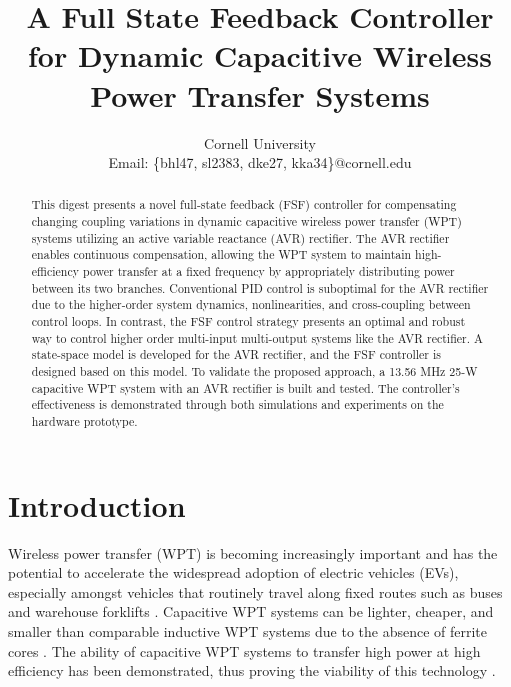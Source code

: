 \documentclass[conference, twocolumn, letterpaper]{IEEEtran}
\title{\singlespacing \fontsize{24}{29} A Full State Feedback Controller for Dynamic Capacitive Wireless Power Transfer Systems}
\author{
    \IEEEauthorblockN{Ben Liao, Sophia Lin, Dheeraj Etta, Khurram K. Afridi}
\IEEEauthorblockA{Department of Electrical and Computer Engineering}
        Cornell University \\
        Email: \{bhl47, sl2383, dke27, kka34\}@cornell.edu
}
\begin{document}
\maketitle

\vspace{-0.85cm}
\begin{abstract}
This digest presents a novel full-state feedback (FSF) controller for compensating changing coupling variations in dynamic capacitive wireless power transfer (WPT) systems utilizing an active variable reactance (AVR) rectifier. The AVR rectifier enables continuous compensation, allowing the WPT system to maintain high-efficiency power transfer at a fixed frequency by appropriately distributing power between its two branches. Conventional PID control is suboptimal for the AVR rectifier due to the higher-order system dynamics, nonlinearities, and cross-coupling between control loops. In contrast, the FSF control strategy presents an optimal and robust way to control higher order multi-input multi-output systems like the AVR rectifier. A state-space model is developed for the AVR rectifier, and the FSF controller is designed based on this model. To validate the proposed approach, a 13.56 MHz 25-W capacitive WPT system with an AVR rectifier is built and tested. The controller’s effectiveness is demonstrated through both simulations and experiments on the hardware prototype.
\end{abstract}

\vspace{0.5cm}

\section{Introduction}

Wireless power transfer (WPT) is becoming increasingly important and has the potential to accelerate the widespread adoption of electric vehicles (EVs), especially amongst vehicles that routinely travel along fixed routes such as buses and warehouse forklifts \cite{2015_Miller_Journal, 2018_Regensburger_COMPEL}. Capacitive WPT systems can be lighter, cheaper, and smaller than comparable inductive WPT systems due to the absence of ferrite cores \cite{2013_Covic_Journal}. The ability of capacitive WPT systems to transfer high power at high efficiency has been demonstrated, thus proving the viability of this technology \cite{2023_Maji_WPTCE}.
\end{document}
